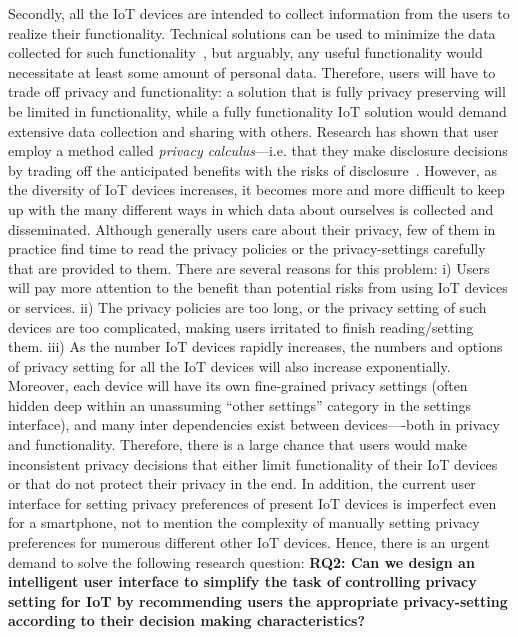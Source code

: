 Secondly, all the IoT devices are intended to collect information from the users to realize their functionality. Technical solutions can be used to minimize the data collected for such functionality~\cite{kobsa2006privacy,pfitzmann2001anonymity,verykios2004state}, but arguably, any useful functionality would necessitate at least some amount of personal data. Therefore, users will have to trade off privacy and functionality: a solution that is fully privacy preserving will be limited in functionality, while a fully functionality IoT solution would demand extensive data collection and sharing with others. Research has shown that user employ a method called \textit{privacy calculus}---i.e. that they make disclosure decisions by trading off the anticipated benefits with the risks of disclosure~\cite{culnan1993did,laufer1977privacy,taylor2009privacy}. However, as the diversity of IoT devices increases, it becomes more and more difficult to keep up with the many different ways in which data about ourselves is collected and disseminated. Although generally users care about their privacy, few of them in practice find time to read the privacy policies or the privacy-settings carefully that are provided to them. There are several reasons for this problem: i) Users will pay more attention to the benefit than potential risks from using IoT devices or services. ii) The privacy policies are too long, or the privacy setting of such devices are too complicated, making users irritated to finish reading/setting them. iii) As the number IoT devices rapidly increases, the numbers and options of privacy setting for all the IoT devices will also increase exponentially. Moreover, each device will have its own fine-grained privacy settings (often hidden deep within an unassuming “other settings” category in the settings interface), and many inter dependencies exist between devices—-both in privacy and functionality. Therefore, there is a large chance that users would make inconsistent privacy decisions that either limit functionality of their IoT devices or that do not protect their privacy in the end. In addition, the current user interface for setting privacy preferences of present IoT devices is imperfect even for a smartphone, not to mention the complexity of manually setting privacy preferences for numerous different other IoT devices. Hence, there is an urgent demand to solve the following research question: \textbf{RQ2: Can we design an intelligent user interface to simplify the task of controlling privacy setting for IoT by recommending users the appropriate privacy-setting according to their decision making characteristics?}


